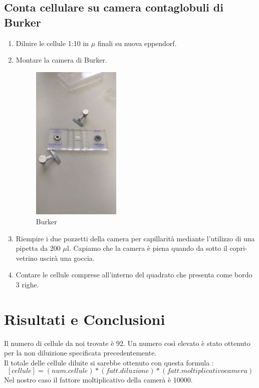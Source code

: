 \subsection{Conta cellulare su camera contaglobuli di Burker}
\begin{enumerate}
    \item Diluire le cellule 1:10 in $\mu$ finali su nuova eppendorf.
    \item Montare la camera di Burker.

    \begin{figure}[H]
    \centering
    \includegraphics[width = 0.4\textwidth]{./immagini/Burker.png}
    \caption{Burker}
    \end{figure}

    \item Riempire i due pozzetti della camera per capillarità mediante l'utilizzo di
    una pipetta da 200 $\mu$l. Capiamo che la camera è piena quando da sotto il
    copri-vetrino uscirà una goccia.
    \item Contare le cellule comprese all'interno del quadrato che presenta come bordo 3
    righe.
\end{enumerate}

\section{Risultati e Conclusioni}

Il numero di cellule da noi trovate è 92. Un numero così elevato è stato ottenuto per la
non diluizione specificata precedentemente. \\
Il totale delle cellule diluite si sarebbe ottenuto con questa formula :
    $$[cellule] = (num. cellule)*(fatt. diluzione)*(fatt. moltiplicativo camera)$$
Nel nostro caso il fattore moltiplicativo della camerà è 10000.


